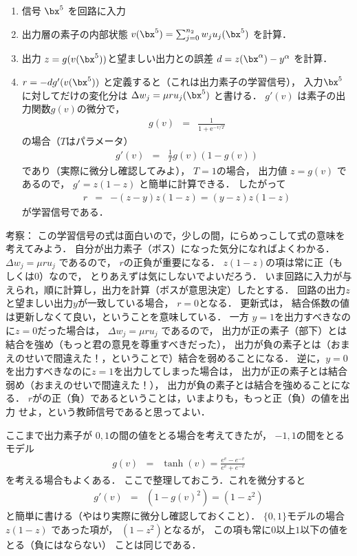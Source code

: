 \documentclass[a4paper,11pt]{jarticle}
\begin{document}
\begin{enumerate}
 \item 信号 $\bx^5$ を回路に入力
\item 出力層の素子の内部状態 $ v(\bx^5) = \sum_{j=0}^{n_2} w_j u_j(\bx^5)
      $ を計算．
 \item 出力 $z=g(v(\bx^5))$と望ましい出力との誤差 $ d = z(\bx^\alpha) - y^\alpha $ を計算．
 \item  $ r = -d g'(v(\bx^5)) $ と定義すると（これは出力素子の学習信号），
	入力$\bx^5$に対してだけの変化分は $ \Delta w_{j} = \mu r u_j(\bx^5) $
	と書ける．
$g'(v)$ は素子の出力関数$g(v)$の微分で，
\begin{eqnarray}
g(v) & = & \frac{1}{1 + \text{e}^{-v/T} } 
\end{eqnarray}
の場合（$T$はパラメータ）
\begin{eqnarray}
g'(v) & = & \frac{1}{T} g(v) ( 1 - g(v) )
\end{eqnarray}
であり（実際に微分し確認してみよ），
$T=1$の場合，
出力値 $z=g(v) $ であるので，
$ g' = z(1-z) $
と簡単に計算できる．
したがって
\begin{eqnarray}
 r & = &  - (z-y) z (1-z) =  (y -z) z (1-z)
\end{eqnarray}
が学習信号である．
\end{enumerate}

\noindent
{\gt 考察：}
この学習信号の式は面白いので，少しの間，にらめっこして式の意味を考えてみよう．
自分が出力素子（ボス）になった気分になればよくわかる．
$ \Delta w_{j}  =  \mu   r u_j $ であるので，
$r$の正負が重要になる．
$z(1-z)$の項は常に正（もしくは$0$）なので，
とりあえずは気にしないでよいだろう．
いま回路に入力が与えられ，順に計算し，出力を計算（ボスが意思決定）したとする．
回路の出力$z$と望ましい出力$y$が一致している場合，
$r=0$となる．
更新式は，
結合係数の値は更新しなくて良い，ということを意味している．
一方 $y=1$を出力すべきなのに$z=0$だった場合は，
$ \Delta w_{j}  =  \mu   r u_j $ であるので，
出力が正の素子（部下）とは結合を強め（もっと君の意見を尊重すべきだった），
出力が負の素子とは（おまえのせいで間違えた！，ということで）結合を弱めることになる．
逆に，$y=0$を出力すべきなのに$z=1$を出力してしまった場合は，
出力が正の素子とは結合弱め（おまえのせいで間違えた！），
出力が負の素子とは結合を強めることになる．
$r$がの正（負）であるということは，いまよりも，もっと正（負）の値を出力
せよ，という教師信号であると思ってよい．

ここまで出力素子が $0,1$の間の値をとる場合を考えてきたが，
$-1,1$の間をとるモデル
\begin{eqnarray}
 g(v) & = & \tanh(v) = \frac{e^v - e^{-v}}{e^v + e^{-v}}
\end{eqnarray}
を考える場合もよくある\cite{sgeman92a}．
ここで整理しておこう．これを微分すると
\begin{eqnarray}
 g'(v) & = & (1-g(v)^2) = (1-z^2)
\end{eqnarray}
と簡単に書ける（やはり実際に微分し確認しておくこと）．
$\{0,1\}$モデルの場合 $z(1-z)$ であった項が，
$(1-z^2)$となるが，
この項も常に$0$以上$1$以下の値をとる（負にはならない）
ことは同じである．
\vskip 5mm
\end{document}
